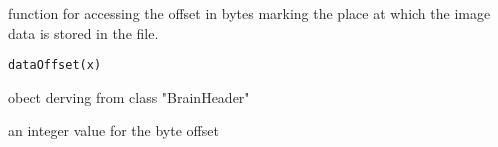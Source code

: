\begin{Description}\relax
function for accessing the offset in bytes marking the place at which
the image data is stored in the file.
\end{Description}
\begin{Usage}
\begin{verbatim}
dataOffset(x)
\end{verbatim}
\end{Usage}
\begin{Arguments}
\begin{ldescription}
\item[\code{x}] obect derving from class "BrainHeader" 
\end{ldescription}
\end{Arguments}
\begin{Value}
an integer value for the byte offset
\end{Value}

